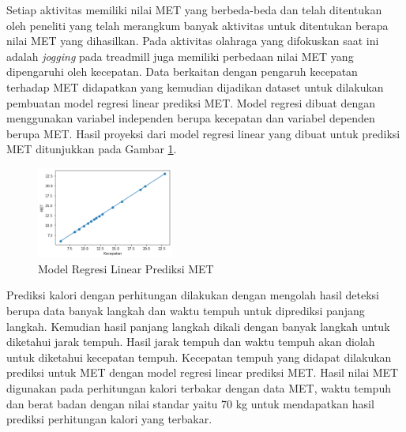 \begin{enumerate}
  Setiap aktivitas memiliki nilai MET yang berbeda-beda dan telah ditentukan oleh peneliti yang telah merangkum banyak aktivitas untuk ditentukan berapa nilai MET yang dihasilkan. Pada aktivitas olahraga yang difokuskan saat ini adalah \emph{jogging} pada treadmill juga memiliki perbedaan nilai MET yang dipengaruhi oleh kecepatan. Data berkaitan dengan pengaruh kecepatan terhadap MET didapatkan yang kemudian dijadikan dataset untuk dilakukan pembuatan model regresi linear prediksi MET. Model regresi dibuat dengan menggunakan variabel independen berupa kecepatan dan variabel dependen berupa MET. Hasil proyeksi dari model regresi linear yang dibuat untuk prediksi MET ditunjukkan pada Gambar \ref{fig:ModelRegresiMET}.

  \begin{figure} [ht]
    \centering
    \includegraphics[width=0.4\textwidth]{gambar/model regresi met.png}
    \caption{Model Regresi Linear Prediksi MET}
    \label{fig:ModelRegresiMET}
  \end{figure}
  
  Prediksi kalori dengan perhitungan dilakukan dengan mengolah hasil deteksi berupa data banyak langkah dan waktu tempuh untuk diprediksi panjang langkah. Kemudian hasil panjang langkah dikali dengan banyak langkah untuk diketahui jarak tempuh. Hasil jarak tempuh dan waktu tempuh akan diolah untuk diketahui kecepatan tempuh. Kecepatan tempuh yang didapat dilakukan prediksi untuk MET dengan model regresi linear prediksi MET. Hasil nilai MET digunakan pada perhitungan kalori terbakar dengan data MET, waktu tempuh dan berat badan dengan nilai standar yaitu 70 kg untuk mendapatkan hasil prediksi perhitungan kalori yang terbakar.

\end{enumerate}


